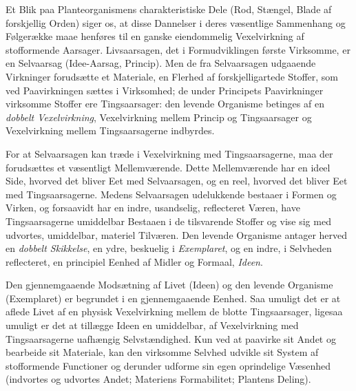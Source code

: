 \documentclass[11pt]{book}
\newcommand{\opage}[1]{\marginnote{\footnotesize\textit{[#1]}}}
\begin{document}
Et Blik paa Planteorganismens charakteristiske Dele (Rod, Stængel,
Blade af forskjellig Orden) siger os, at disse Dannelser i deres
væsentlige Sammenhang og Følgerække maae henføres til en ganske
eiendommelig Vexelvirkning af stofformende Aarsager. Livsaarsagen,
det i Formudviklingen første Virksomme, er en Selvaarsag
(Idee-Aarsag, Princip). Men de fra Selvaarsagen udgaaende Virkninger
forudsætte et Materiale, en Flerhed af forskjelligartede Stoffer, som
ved Paavirkningen sættes i Virksomhed; de under Principets
Paavirkninger virksomme Stoffer ere Tingsaarsager: den levende
Organisme betinges af en \emph{dobbelt Vexelvirkning}, Vexelvirkning
mellem Princip og Tingsaarsager og Vexelvirkning mellem
Tingsaarsagerne indbyrdes.

For at Selvaarsagen kan træde i Vexelvirkning med Tingsaarsagerne,
maa der forudsættes et væsentligt Mellemværende. Dette Mellemværende
har en ideel Side, hvorved det bliver Eet med Selvaarsagen, og en
reel, hvorved det bliver Eet med Tingsaarsagerne. Medens Selvaarsagen
udelukkende bestaaer i Formen og Virken, og forsaavidt har en indre,
usandselig, reflecteret Væren, have Tingsaarsagerne umiddelbar
Bestaaen i de tilsvarende Stoffer og vise sig med udvortes,
umiddelbar, materiel Tilværen. Den levende Organisme antager herved
en \emph{dobbelt Skikkelse}, en ydre, beskuelig i \emph{Exemplaret},
og en indre, i Selvheden reflecteret, en principiel Eenhed af Midler
og Formaal, \emph{Ideen}.

Den gjennemgaaende Modsætning af Livet (Ideen) og den levende
Organisme (Exemplaret) er begrundet i en gjennemgaaende Eenhed. Saa
umuligt det er at aflede Livet af en physisk Vexelvirkning mellem de
blotte Tingsaarsager,
\opage{267} \setcounter{footnote}{0}%
ligesaa umuligt er det at tillægge Ideen en
umiddelbar, af Vexelvirkning med Tingsaarsagerne uafhængig
Selvstændighed. Kun ved at paavirke sit Andet og bearbeide sit
Materiale, kan den virksomme Selvhed udvikle sit System af
stofformende Functioner og derunder udforme sin egen oprindelige
Væsenhed (indvortes og udvortes Andet; Materiens Formabilitet;
Plantens Deling).
\end{document}
